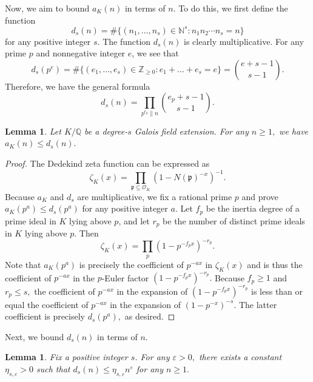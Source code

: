 \documentclass[12pt]{amsart}
\newtheorem{lemma}[theorem]{Lemma}
\theoremstyle{definition}
\numberwithin{equation}{section}
\newcommand{\Q}{\mathbb{Q}}
\newcommand{\Z}{\mathbb{Z}}
\begin{document}
Now, we aim to bound $a_K(n)$ in terms of $n$.
To do this, we first define the function $$d_s(n) = \#\{(n_1, \ldots, n_s) \in \mathbb N^s : n_1 n_2 \cdots n_s = n\}$$ for any positive integer $s. $ The function $d_s(n)$ is clearly multiplicative. For any prime $p$ and nonnegative integer $e$, we see that $$d_s(p^e) = \# \{(e_1, \ldots, e_s) \in \Z_{\geq 0} : e_1 + \dots + e_s = e\} = \binom{e + s-1}{s-1}.$$ Therefore, we have the general formula $$d_s(n) = \prod_{p^{e_p} \|n} \binom{e_p+s-1}{s-1}.$$ 

\begin{lemma}
    Let $K/\Q$ be a degree-$s$ Galois field extension. For any $n \geq 1,$ we have $a_K(n) \leq d_s(n).$
\end{lemma}

\begin{proof}
    The Dedekind zeta function can be expressed as $$\zeta_K(x) = \prod_{\mathfrak p \subseteq \mathcal O_K} (1 - N(\mathfrak p)^{-x})^{-1}.$$ Because $a_K$ and $d_s$ are multiplicative, we fix a rational prime $p$ and prove $a_K(p^a) \leq d_s(p^a)$ for any positive integer $a$. Let $f_p$ be the inertia degree of a prime ideal in $K$ lying above $p$, and let $r_p$ be the number of distinct prime ideals in $K$ lying above $p$. Then $$\zeta_K(x) = \prod_p  (1 - p^{-f_p x})^{-r_p}.$$ 
    Note that $a_K(p^a)$ is precisely the coefficient of $p^{-ax}$ in $\zeta_K(x)$ and is thus the coefficient of $p^{-ax}$ in the $p$-Euler factor $(1 - p^{-f_p x})^{-r_p}.$ Because $f_p \geq 1$ and $r_p \leq s,$ the coefficient of $p^{-ax}$ in the expansion of $(1 - p^{-f_p x})^{-r_p}$ is less than or equal the coefficient of $p^{-ax}$ in the expansion of $(1 - p^{-x})^{-s}.$ The latter coefficient is precisely $d_s(p^a),$ as desired.
\end{proof}

Next, we bound $d_s(n)$ in terms of $n$. 

\begin{lemma}
    Fix a positive integer $s$. For any $\varepsilon > 0,$ there exists a constant $\eta_{s, \varepsilon} > 0$ such that $d_s(n) \leq \eta_{s, \varepsilon} n^\varepsilon$ for any $n \geq 1.$
\end{lemma}
\end{document}
